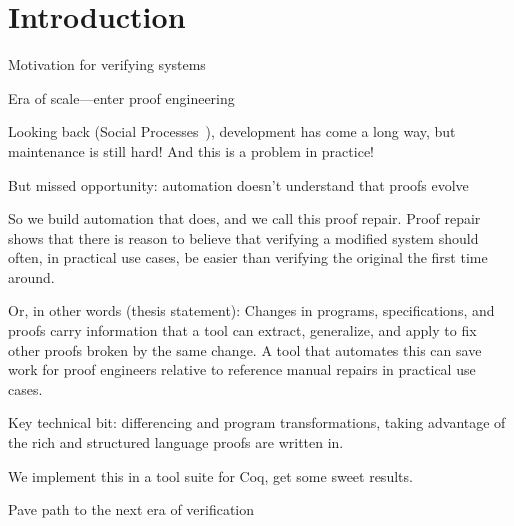\chapter{Introduction}

Motivation for verifying systems

Era of scale---enter proof engineering~\cite{PGL-045}

Looking back (Social Processes~\cite{DeMillo1977}), development has come a long way, but maintenance is still hard! And this is a problem in practice!

But missed opportunity: automation doesn't understand that proofs evolve

So we build automation that does, and we call this proof repair. Proof repair shows that there is reason to believe that verifying a modified system should often, in practical use cases, be easier than verifying the original the first time around.

Or, in other words (thesis statement): Changes in programs, specifications, and proofs carry information that a tool can extract, generalize, and apply to fix other proofs broken by the same change. A tool that automates this can save work for proof engineers relative to reference manual repairs in practical use cases.

Key technical bit: differencing and program transformations, taking advantage of the rich and structured language proofs are written in.

We implement this in a tool suite for Coq, get some sweet results.

Pave path to the next era of verification




